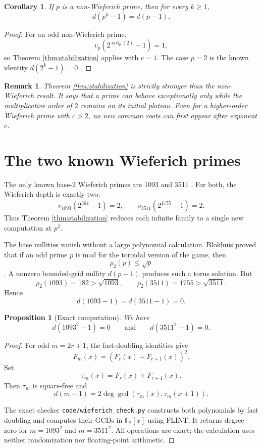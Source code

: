 \documentclass[a4paper]{article}
\newtheorem{corollary}[theorem]{Corollary}
\newtheorem{proposition}[theorem]{Proposition}
\newtheorem{remark}[theorem]{Remark}
\newcommand{\F}{\mathbb{F}}
\newcommand{\ord}[2][]{\operatorname{ord}_{#1}\!\left(#2\right)}
\begin{document}
\begin{corollary}\label{cor:non-wieferich}
	If $p$ is a non-Wieferich prime, then for every $k\geq1$,
	\[
		d(p^k-1)=d(p-1).
	\]
\end{corollary}

\begin{proof}
	For an odd non-Wieferich prime,
	\[
		v_p\!\left(2^{\ord[p]{2}}-1\right)=1,
	\]
	so Theorem \ref{thm:stabilization} applies with $c=1$.
	The case $p=2$ is the known identity $d(2^k-1)=0$ \cite{Sutner1989}.
\end{proof}

\begin{remark}
	Theorem \ref{thm:stabilization} is strictly stronger than the non-Wieferich result.
	It says that a prime can behave exceptionally only while the multiplicative order of $2$ remains on its initial plateau.
	Even for a higher-order Wieferich prime with $c>2$, no new common roots can first appear after exponent $c$.
\end{remark}

\section{The two known Wieferich primes}

The only known base-$2$ Wieferich primes are 1093 and 3511 \cite{CrandallSearch,PrimeGridWieferich}.
For both, the Wieferich depth is exactly two:
\[
	v_{1093}(2^{364}-1)=2,\qquad
	v_{3511}(2^{1755}-1)=2.
\]
Thus Theorem \ref{thm:stabilization} reduces each infinite family to a single new computation at $p^2$.

The base nullities vanish without a large polynomial calculation.
Blokhuis proved that if an odd prime $p$ is mad for the toroidal version of the game, then
\[
	\rho_2(p)\leq\sqrt p
\]
\cite[Theorem 4.2]{ButtonMadness}.
A nonzero bounded-grid nullity $d(p-1)$ produces such a torus solution.
But
\[
	\rho_2(1093)=182>\sqrt{1093},
	\qquad
	\rho_2(3511)=1755>\sqrt{3511}.
\]
Hence
\[
	d(1093-1)=d(3511-1)=0.
\]

\begin{proposition}[Exact computation]\label{prop:known-computation}
	We have
	\[
		d(1093^2-1)=0
		\qquad\text{and}\qquad
		d(3511^2-1)=0.
	\]
\end{proposition}

\begin{proof}
	For odd $m=2r+1$, the fast-doubling identities give
	\[
		F_m(x)=\left(F_r(x)+F_{r+1}(x)\right)^2.
	\]
	Set
	\[
		\tau_m(x)=F_r(x)+F_{r+1}(x).
	\]
	Then $\tau_m$ is square-free and
	\[
		d(m-1)
		=
		2\deg\gcd\!\left(\tau_m(x),\tau_m(x+1)\right).
	\]

	The exact checker \texttt{code/wieferich\_check.py} constructs both polynomials by fast doubling and computes their GCDs in $\F_2[x]$ using FLINT.
	It returns degree zero for $m=1093^2$ and $m=3511^2$.
	All operations are exact; the calculation uses neither randomization nor floating-point arithmetic.
\end{proof}
\end{document}
